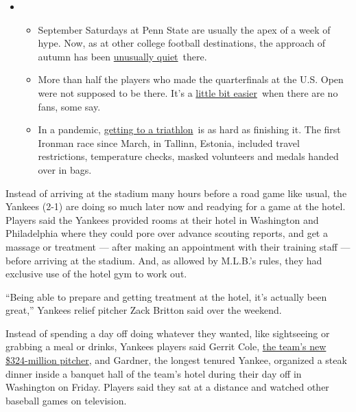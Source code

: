 \begin{itemize}
\item
  \begin{itemize}
  \tightlist
  \item
    September Saturdays at Penn State are usually the apex of a week of
    hype. Now, as at other college football destinations, the approach
    of autumn has been
    \href{https://www.nytimes3xbfgragh.onion/2020/09/09/sports/penn-state-college-football-canceled.html?action=click\&pgtype=Article\&state=default\&region=MAIN_CONTENT_2\&context=storylines_keepup}{unusually
    quiet}~there.
  \item
    More than half the players who made the quarterfinals at the U.S.
    Open were not supposed to be there. It's a
    \href{https://www.nytimes3xbfgragh.onion/2020/09/09/sports/us-open-crowd.html?action=click\&pgtype=Article\&state=default\&region=MAIN_CONTENT_2\&context=storylines_keepup}{little
    bit easier}~when there are no fans, some say.
  \item
    In a pandemic,
    \href{https://www.nytimes3xbfgragh.onion/2020/09/08/sports/ironman-tallinn-triathlon-pandemic.html?action=click\&pgtype=Article\&state=default\&region=MAIN_CONTENT_2\&context=storylines_keepup}{getting
    to a triathlon}~is as hard as finishing it. The first Ironman race
    since March, in Tallinn, Estonia, included travel restrictions,
    temperature checks, masked volunteers and medals handed over in
    bags.
  \end{itemize}
\end{itemize}

Instead of arriving at the stadium many hours before a road game like
usual, the Yankees (2-1) are doing so much later now and readying for a
game at the hotel. Players said the Yankees provided rooms at their
hotel in Washington and Philadelphia where they could pore over advance
scouting reports, and get a massage or treatment --- after making an
appointment with their training staff --- before arriving at the
stadium. And, as allowed by M.L.B.'s rules, they had exclusive use of
the hotel gym to work out.

``Being able to prepare and getting treatment at the hotel, it's
actually been great,'' Yankees relief pitcher Zack Britton said over the
weekend.

Instead of spending a day off doing whatever they wanted, like
sightseeing or grabbing a meal or drinks, Yankees players said Gerrit
Cole,
\href{https://www.nytimes3xbfgragh.onion/2020/07/22/sports/baseball/gerrit-cole-yankees.html}{the
team's new \$324-million pitcher}, and Gardner, the longest tenured
Yankee, organized a steak dinner inside a banquet hall of the team's
hotel during their day off in Washington on Friday. Players said they
sat at a distance and watched other baseball games on television.

